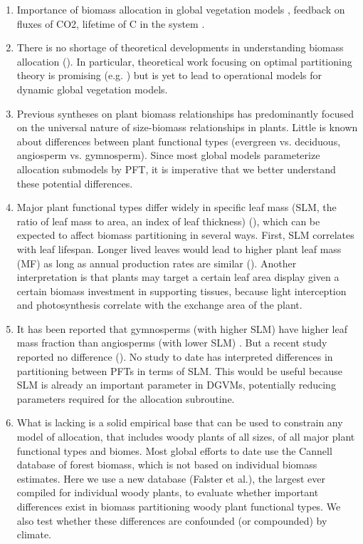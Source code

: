 \documentclass[a4paper]{article}\usepackage[]{graphicx}\usepackage[]{color}
\begin{document}
\begin{enumerate}
\item Importance of biomass allocation in global vegetation models \cite{ise_comparison_2010}, feedback on fluxes of CO2, lifetime of C in the system \cite{friend_carbon_2014}.
  
\item There is no shortage of theoretical developments in understanding biomass allocation (\cite{cannell_carbon_1994,franklin_modeling_2012,enquist_land_2012}). In particular, theoretical work focusing on optimal partitioning theory is promising (e.g. \cite{valentine_modeling_2012}) but is yet to lead to operational models for dynamic global vegetation models.

\item Previous syntheses on plant biomass relationships has predominantly focused on the universal nature of size-biomass relationships in plants. Little is known about differences between plant functional types (evergreen vs. deciduous, angiosperm vs. gymnosperm). Since most global models parameterize allocation submodels by PFT, it is imperative that we better understand these potential differences.

\item Major plant functional types differ widely in specific leaf mass (SLM, the ratio of leaf mass to area, an index of leaf thickness) (\cite{poorter_causes_2009}), which can be expected to affect biomass partitioning in several ways. First, SLM correlates with leaf lifespan. Longer lived leaves would lead to higher plant leaf mass (MF) as long as annual production rates are similar (\cite{enquist_global_2002}). Another interpretation is that plants may target a certain leaf area display given a certain biomass investment in supporting tissues, because light interception and photosynthesis correlate with the exchange area of the plant. 

\item It has been reported that gymnosperms (with higher SLM) have higher leaf mass fraction than angiosperms (with lower SLM) \cite{enquist_global_2002, mccarthy_consistency_2007, poorter_biomass_2012, sardans_tree_2013}. But a recent study reported no difference (\cite{wolf_allometric_2010}). No study to date has interpreted differences in partitioning between PFTs in terms of SLM. This would be useful because SLM is already an important parameter in DGVMs, potentially reducing parameters required for the allocation subroutine.

\item What is lacking is a solid empirical base that can be used to constrain any model of allocation, that includes woody plants of all sizes, of all major plant functional types and biomes. Most global efforts to date use the Cannell database of forest biomass, which is not based on individual biomass estimates. Here we use a new database (Falster et al.), the largest ever compiled for individual woody plants, to evaluate whether important differences exist in biomass partitioning woody plant functional types. We also test whether these differences are confounded (or compounded) by climate.
  



\end{enumerate}
\end{document}

